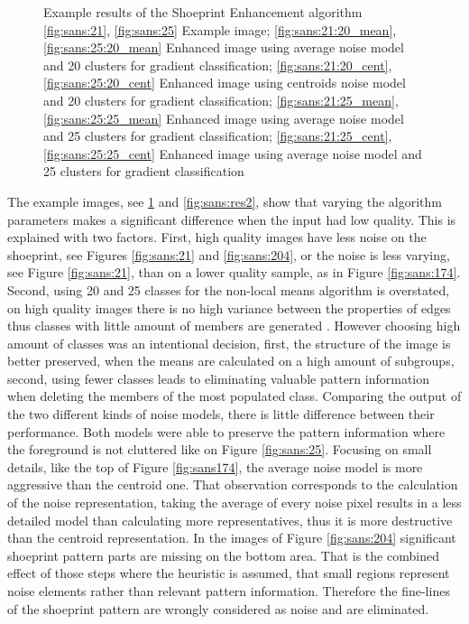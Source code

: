 \documentclass[draft,final]{vutinfth} %
\begin{document}
{\begin{figure}[H]
\caption{Example results of the Shoeprint Enhancement algorithm
				\ref{fig:sans:21}, \ref{fig:sans:25} Example image; \ref{fig:sans:21:20_mean}, \ref{fig:sans:25:20_mean} Enhanced image using average noise model and 20 clusters for gradient classification; \ref{fig:sans:21:20_cent}, \ref{fig:sans:25:20_cent} Enhanced image using centroids noise model and 20 clusters for gradient classification; \ref{fig:sans:21:25_mean}, \ref{fig:sans:25:25_mean} Enhanced image using average noise model and 25 clusters for gradient classification; \ref{fig:sans:21:25_cent}, \ref{fig:sans:25:25_cent} Enhanced image using average noise model and 25 clusters for gradient classification}
\label{fig:sans:res1}

\end{figure}
}


\par
The example images, see  \ref{fig:sans:res1} and \ref{fig:sans:res2}, show that varying the algorithm parameters makes a significant difference when the input had low quality.
This is explained with two factors.
First, high quality images have less noise on the shoeprint, see Figures \ref{fig:sans:21} and \ref{fig:sans:204}, or the noise is less varying, see Figure \ref{fig:sans:21}, than on a lower quality sample, as in Figure \ref{fig:sans:174}.
Second, using 20 and 25 classes for the non-local means algorithm is overstated, on high quality images there is no high variance between the properties of edges thus classes with little amount of members are generated .
However choosing high amount of classes was an intentional decision, first, the structure of the image is better preserved, when the means are calculated on a high amount of subgroups, second, using fewer classes leads to eliminating valuable pattern information when deleting the members of the most populated class.
Comparing the output of the two different kinds of noise models, there is little difference between their performance.
Both models were able to preserve the pattern information where the foreground is not cluttered like on Figure \ref{fig:sans:25}.
Focusing on small details, like the top of Figure \ref{fig:sans174}, the average noise model is more aggressive than the centroid one.
That observation corresponds to the calculation of the noise representation, taking the average of every noise pixel results in a less detailed model than calculating more representatives, thus it is more destructive than the centroid representation.
In the images of Figure \ref{fig:sans:204} significant shoeprint pattern parts are missing on the bottom area.
That is the combined effect of those steps where the heuristic is assumed, that small regions represent noise elements rather than relevant pattern information.
Therefore the fine-lines of the shoeprint pattern are wrongly considered as noise and are eliminated.
\end{document}
